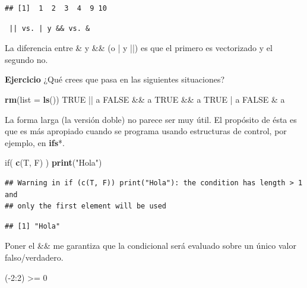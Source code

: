 \documentclass[]{article}
\newenvironment{Shaded}{\begin{snugshade}}{\end{snugshade}}
\newcommand{\KeywordTok}[1]{\textcolor[rgb]{0.13,0.29,0.53}{\textbf{{#1}}}}
\newcommand{\DataTypeTok}[1]{\textcolor[rgb]{0.13,0.29,0.53}{{#1}}}
\newcommand{\DecValTok}[1]{\textcolor[rgb]{0.00,0.00,0.81}{{#1}}}
\newcommand{\StringTok}[1]{\textcolor[rgb]{0.31,0.60,0.02}{{#1}}}
\newcommand{\OtherTok}[1]{\textcolor[rgb]{0.56,0.35,0.01}{{#1}}}
\newcommand{\NormalTok}[1]{{#1}}
\begin{document}
\begin{verbatim}
## [1]  1  2  3  4  9 10
\end{verbatim}

\begin{nota}
\begin{verbatim} || vs. | y && vs. & \end{verbatim}
La diferencia entre \& y \&\& (o | y ||) es que el primero es vectorizado y el
segundo no.
\end{nota}

\textbf{Ejercicio} ¿Qué crees que pasa en las siguientes situaciones?

\begin{Shaded}
\begin{Highlighting}[]
\KeywordTok{rm}\NormalTok{(}\DataTypeTok{list =} \KeywordTok{ls}\NormalTok{())}
\OtherTok{TRUE} \NormalTok{||}\StringTok{ }\NormalTok{a}
\OtherTok{FALSE} \NormalTok{&&}\StringTok{ }\NormalTok{a}
\OtherTok{TRUE} \NormalTok{&&}\StringTok{ }\NormalTok{a}
\OtherTok{TRUE} \NormalTok{|}\StringTok{ }\NormalTok{a}
\OtherTok{FALSE} \NormalTok{&}\StringTok{ }\NormalTok{a}
\end{Highlighting}
\end{Shaded}

La forma larga (la versión doble) no parece ser muy útil. El propósito
de ésta es que es más apropiado cuando se programa usando estructuras de
control, por ejemplo, en \textbf{ifs}*.

\begin{Shaded}
\begin{Highlighting}[]
\NormalTok{if( }\KeywordTok{c}\NormalTok{(T, F) ) }\KeywordTok{print}\NormalTok{(}\StringTok{"Hola"}\NormalTok{)}
\end{Highlighting}
\end{Shaded}

\begin{verbatim}
## Warning in if (c(T, F)) print("Hola"): the condition has length > 1 and
## only the first element will be used
\end{verbatim}

\begin{verbatim}
## [1] "Hola"
\end{verbatim}

Poner el \&\& me garantiza que la condicional será evaluado sobre un
único valor falso/verdadero.

\begin{Shaded}
\begin{Highlighting}[]
\NormalTok{(-}\DecValTok{2}\NormalTok{:}\DecValTok{2}\NormalTok{) >=}\StringTok{ }\DecValTok{0} 
\end{Highlighting}
\end{Shaded}
\end{document}
